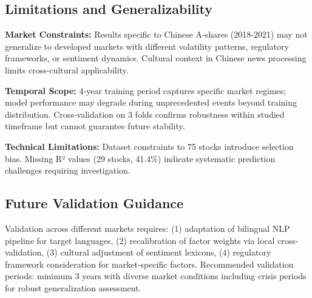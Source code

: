\documentclass[3p,times,procedia]{elsarticle}
\begin{document}
\subsection{Limitations and Generalizability}

\textbf{Market Constraints:} Results specific to Chinese A-shares (2018-2021) may not generalize to developed markets with different volatility patterns, regulatory frameworks, or sentiment dynamics. Cultural context in Chinese news processing limits cross-cultural applicability.

\textbf{Temporal Scope:} 4-year training period captures specific market regimes; model performance may degrade during unprecedented events beyond training distribution. Cross-validation on 3 folds confirms robustness within studied timeframe but cannot guarantee future stability.

\textbf{Technical Limitations:} Dataset constraints to 75 stocks introduce selection bias. Missing R² values (29 stocks, 41.4\%) indicate systematic prediction challenges requiring investigation.

\subsection{Future Validation Guidance}

Validation across different markets requires: (1) adaptation of bilingual NLP pipeline for target languages, (2) recalibration of factor weights via local cross-validation, (3) cultural adjustment of sentiment lexicons, (4) regulatory framework consideration for market-specific factors. Recommended validation periods: minimum 3 years with diverse market conditions including crisis periods for robust generalization assessment.

\FloatBarrier
\vspace*{-3pt} 




\end{document}
